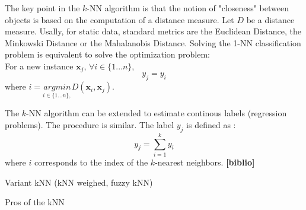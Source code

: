 \noindent The key point in the $k$-NN algorithm is that the notion of "closeness" between objects is based on the computation of a distance measure. Let $D$ be a distance measure. Usally, for static data, standard metrics are the Euclidean Distance, the Minkowski Distance or the Mahalanobis Distance. Solving the 1-NN classification problem is equivalent to solve the optimization problem: \\
\noindent For a new instance $\textbf{x}_j$, $\forall i \in \{1...n\}$,
\begin{equation}
y_j = y_{i}
\end{equation}
where $i={\underset{i \in \{1...n\},}{argmin}  D(\textbf{x}_i,\textbf{x}_j)}$.

The $k$-NN algorithm can be extended to estimate continous labels (regression problems). The procedure is similar. The label $y_j$ is defined as :
\begin{equation}
y_j = \sum_{i=1}^{k} y_{i}
\end{equation}
where $i$ corresponds to the index of the $k$-nearest neighbors. \textbf{[biblio]}

Variant kNN (kNN weighed, fuzzy kNN)

Pros of the kNN


